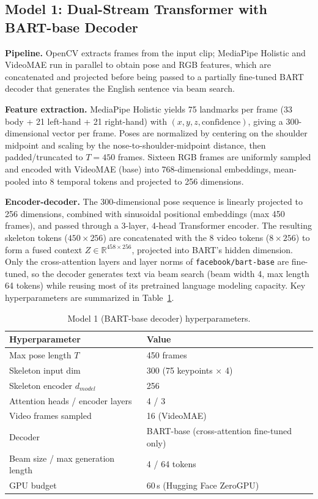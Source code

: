 \documentclass[pdflatex,sn-mathphys-num]{sn-jnl}
\begin{document}
\subsection{Model 1: Dual-Stream Transformer with BART-base Decoder}\label{sec:model1}
\textbf{Pipeline.} OpenCV extracts frames from the input clip; MediaPipe Holistic and VideoMAE run in parallel to obtain pose and RGB features, which are concatenated and projected before being passed to a partially fine-tuned BART decoder that generates the English sentence via beam search.

\textbf{Feature extraction.} MediaPipe Holistic yields 75 landmarks per frame (33 body + 21 left-hand + 21 right-hand) with $(x,y,z,\text{confidence})$, giving a 300-dimensional vector per frame. Poses are normalized by centering on the shoulder midpoint and scaling by the nose-to-shoulder-midpoint distance, then padded/truncated to $T{=}450$ frames. Sixteen RGB frames are uniformly sampled and encoded with VideoMAE (base) into 768-dimensional embeddings, mean-pooled into 8 temporal tokens and projected to 256 dimensions.

\textbf{Encoder-decoder.} The 300-dimensional pose sequence is linearly projected to 256 dimensions, combined with sinusoidal positional embeddings (max 450 frames), and passed through a 3-layer, 4-head Transformer encoder. The resulting skeleton tokens ($450{\times}256$) are concatenated with the 8 video tokens ($8{\times}256$) to form a fused context $Z \in \mathbb{R}^{458\times256}$, projected into BART's hidden dimension. Only the cross-attention layers and layer norms of \texttt{facebook/bart-base} are fine-tuned, so the decoder generates text via beam search (beam width 4, max length 64 tokens) while reusing most of its pretrained language modeling capacity. Key hyperparameters are summarized in Table~\ref{tab:model1-hp}.

\begin{table}[h]
\centering
\caption{Model 1 (BART-base decoder) hyperparameters.}\label{tab:model1-hp}
\begin{tabular}{@{}ll@{}}
\toprule
Hyperparameter & Value \\
\midrule
Max pose length $T$ & 450 frames \\
Skeleton input dim & 300 (75 keypoints $\times$ 4) \\
Skeleton encoder $d_{model}$ & 256 \\
Attention heads / encoder layers & 4 / 3 \\
Video frames sampled & 16 (VideoMAE) \\
Decoder & BART-base (cross-attention fine-tuned only) \\
Beam size / max generation length & 4 / 64 tokens \\
GPU budget & 60\,s (Hugging Face ZeroGPU) \\
\bottomrule
\end{tabular}
\end{table}
\end{document}
